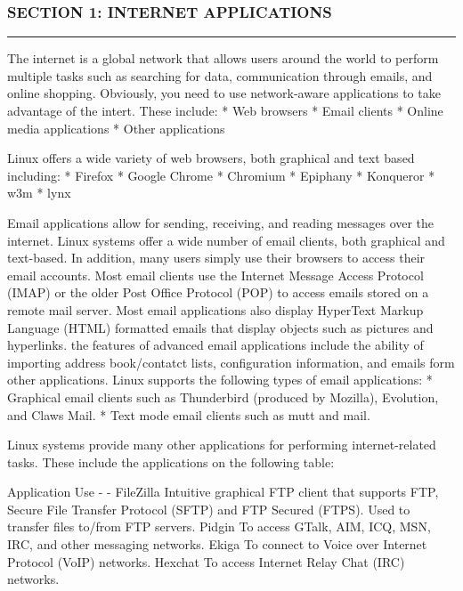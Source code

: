 \subsubsection{SECTION 1: INTERNET
APPLICATIONS}\label{section-1-internet-applications}

\begin{center}\rule{3in}{0.4pt}\end{center}

The internet is a global network that allows users around the world to
perform multiple tasks such as searching for data, communication through
emails, and online shopping. Obviously, you need to use network-aware
applications to take advantage of the intert. These include: * Web
browsers * Email clients * Online media applications * Other
applications

Linux offers a wide variety of web browsers, both graphical and text
based including: * Firefox * Google Chrome * Chromium * Epiphany *
Konqueror * w3m * lynx

Email applications allow for sending, receiving, and reading messages
over the internet. Linux systems offer a wide number of email clients,
both graphical and text-based. In addition, many users simply use their
browsers to access their email accounts. Most email clients use the
Internet Message Access Protocol (IMAP) or the older Post Office
Protocol (POP) to access emails stored on a remote mail server. Most
email applications also display HyperText Markup Language (HTML)
formatted emails that display objects such as pictures and hyperlinks.
the features of advanced email applications include the ability of
importing address book/contatct lists, configuration information, and
emails form other applications. Linux supports the following types of
email applications: * Graphical email clients such as Thunderbird
(produced by Mozilla), Evolution, and Claws Mail. * Text mode email
clients such as mutt and mail.

Linux systems provide many other applications for performing
internet-related tasks. These include the applications on the following
table:

Application \textbar{} Use - \textbar{} - FileZilla \textbar{} Intuitive
graphical FTP client that supports FTP, Secure File Transfer Protocol
(SFTP) and FTP Secured (FTPS). Used to transfer files to/from FTP
servers. Pidgin \textbar{} To access GTalk, AIM, ICQ, MSN, IRC, and
other messaging networks. Ekiga \textbar{} To connect to Voice over
Internet Protocol (VoIP) networks. Hexchat \textbar{} To access Internet
Relay Chat (IRC) networks.

